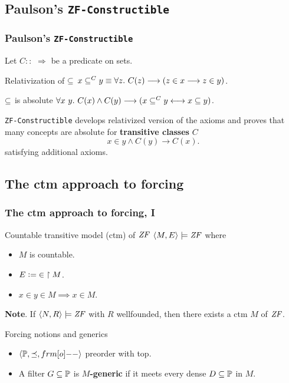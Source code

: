 \documentclass[english]{beamer}
\begin{document}
\subsection{Paulson's \texttt{ZF-Constructible}}

\begin{frame}
  \frametitle{Paulson's \texttt{ZF-Constructible}}
  Let $C :: {}$  $\Rightarrow$  be a predicate on sets.
  \pause
  \begin{block}{Relativization of $\subseteq$}
    $x \subseteq^C y \equiv \forall z.\ C(z) \longrightarrow (z\in x
    \longrightarrow z\in y)$.
  \end{block}
  \pause
  \begin{block}{$\subseteq$ is absolute}
    $\forall x\ y.\ C(x) \land C(y) \longrightarrow (x \subseteq^C y
    \longleftrightarrow x\subseteq y)$.
  \end{block}
  \pause 
  \texttt{ZF-Constructible} develops relativized version of the axioms
  and proves that many concepts are absolute for \textbf{transitive
    classes} $C$
  \[
  x\in y \land C(y)  \longrightarrow C(x).
  \]
  satisfying additional axioms.
\end{frame}


\subsection{The ctm approach to forcing}

\begin{frame}
  \frametitle{The ctm approach to forcing, I}
  \begin{block}{Countable transitive model (ctm) of $\mathit{ZF}$}
    $\langle M, E\rangle \models \mathit{ZF}$ where
    \begin{itemize}
    \item $M$ is countable.
    \item $E \mathrel{\mathop:}= {\in}\restriction M$.
    \item $x\in y \in M \implies x\in M$.
    \end{itemize}
  \end{block}
  \pause%
  \textbf{Note}. If $\langle N, R\rangle \models \mathit{ZF}$ with $R$ wellfounded, then there
  exists a ctm $M$ of $\mathit{ZF}$.
  \pause
  \begin{block}{Forcing notions and generics}
    \begin{itemize}
    \item $\lb \PP, {\preceq} ,\1\rb$ preorder with top.
    \item A filter $G\subseteq \mathbb{P}$ is \textbf{$M$-generic} if it meets
      every dense $D\subseteq \mathbb{P}$ in $M$.
    \end{itemize}
  \end{block}
\end{frame}
\end{document}
